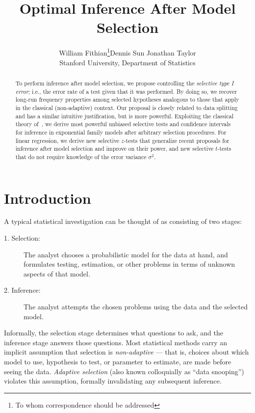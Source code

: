 \documentclass{article}
\theoremstyle{definition}
\newcommand{\sampOrData}{data }
\begin{document}
\title{Optimal Inference After Model Selection}
\author{William Fithian\footnote{To whom correspondence should be addressed}\qquad Dennis Sun \qquad Jonathan Taylor\\[5pt]
{\normalsize Stanford University, Department of Statistics}}
\maketitle


\begin{abstract}
  To perform inference after model selection, we propose controlling the {\em selective type I error}; i.e., the error rate of a test given that it was performed. By doing so, we recover long-run frequency properties among selected hypotheses analogous to those that apply in the classical (non-adaptive) context. Our proposal is closely related to \sampOrData splitting and has a similar intuitive justification, but is more powerful. Exploiting the classical theory of~\citet{lehmann1955completeness}, we derive most powerful unbiased selective tests and confidence intervals for inference in exponential family models after arbitrary selection procedures. For linear regression, we derive new selective $z$-tests that generalize recent proposals for inference after model selection and improve on their power, and new selective $t$-tests that do not require knowledge of the error variance $\sigma^2$.
\end{abstract}


\section{Introduction}\label{sec:intro}

\noindent A typical statistical investigation can be thought of as consisting of two stages:
\begin{description}
\item[1. Selection:] The analyst chooses a probabilistic model for the data at hand, and formulates testing, estimation, or other problems in terms of unknown aspects of that model.
\item[2. Inference:] The analyst attempts the chosen problems using the data and the selected model.
\end{description}

Informally, the selection stage determines what questions to ask, and the inference stage answers those questions. Most statistical methods carry an implicit assumption that selection is {\em non-adaptive} --- that is, choices about which model to use, hypothesis to test, or parameter to estimate, are made before seeing the data. {\em Adaptive selection} (also known colloquially as ``data snooping'') violates this assumption, formally invalidating any subsequent inference.
\end{document}
